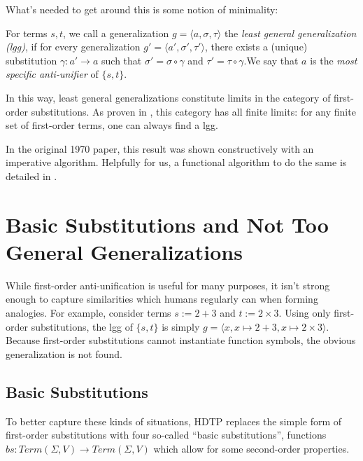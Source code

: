 \documentclass[12pt,a4paper]{article}
\begin{document}
What's needed to get around this is some notion of minimality:

\begin{definition}
    For terms $s,t$, we call a generalization $g = \langle a, \sigma, \tau \rangle$ the \textit{least general generalization (lgg)}, if for every generalization $g' = \langle a', \sigma', \tau' \rangle$, there exists a (unique) substitution $\gamma : a' \to a$ such that $\sigma' = \sigma \circ \gamma$ and $\tau' = \tau \circ \gamma$.\quad We say that $a$ is the \textit{most specific anti-unifier} of $\{s,t\}$.
\end{definition}


In this way, least general generalizations constitute limits in the category of first-order substitutions. As proven in \cite{Plotkin70}, this category has all finite limits: for any finite set of first-order terms, one can always find a lgg.

In the original 1970 paper, this result was shown constructively with an imperative algorithm. Helpfully for us, a functional algorithm to do the same is detailed in \cite{Tabareau2013AntiUnificationWT}.




 



\section{Basic Substitutions and Not Too General Generalizations}

While first-order anti-unification is useful for many purposes, it isn't strong enough to capture similarities which humans regularly can when forming analogies. For example, consider terms $s:= 2+3$ and $t:= 2\times 3$. Using only first-order substitutions, the lgg of $\{s,t\}$ is simply $g = \langle x, x\mapsto 2+3, x\mapsto 2 \times 3\rangle$. Because first-order substitutions cannot instantiate function symbols, the obvious generalization is not found.

\subsection{Basic Substitutions}
% 
To better capture these kinds of situations, HDTP replaces the simple form of first-order substitutions with four so-called ``basic substitutions'', functions $bs : Term(\Sigma, V) \to Term(\Sigma, V)$ which allow for some second-order properties. 
\end{document}
